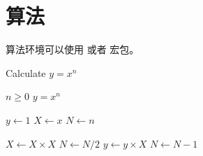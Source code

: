 \section{算法}

算法环境可以使用  或者  宏包。

\renewcommand{\algorithmicrequire}{\textbf{输入：}\unskip}
\renewcommand{\algorithmicensure}{\textbf{输出：}\unskip}

\begin{algorithm}
  \caption{Calculate $y = x^n$}
  \label{alg1}
  \small
  \begin{algorithmic}
    \REQUIRE $n \geq 0$
    \ENSURE $y = x^n$

    \STATE $y \leftarrow 1$
    \STATE $X \leftarrow x$
    \STATE $N \leftarrow n$

        \STATE $X \leftarrow X \times X$
        \STATE $N \leftarrow N / 2$
      \ELSE[$N$ is odd]
        \STATE $y \leftarrow y \times X$
        \STATE $N \leftarrow N - 1$
      \ENDIF
    \ENDWHILE
  \end{algorithmic}
\end{algorithm}
